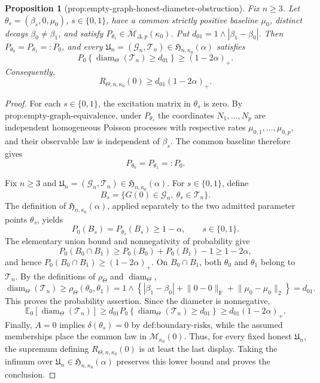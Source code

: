 \documentclass{article}
\newtheorem{proposition}{Proposition}
\begin{document}
\begin{proposition}[prop:empty-graph-honest-diameter-obstruction]\label{prop:empty-graph-honest-diameter-obstruction}
Fix \(n\geq3\). Let \(\theta_s=(\beta_s,0,\mu_0)\), \(s\in\{0,1\}\), have a common strictly positive baseline \(\mu_0\), distinct decays \(\beta_0\neq\beta_1\), and satisfy \(P_{\theta_s}\in\overline{\mathcal M}_{\Delta,p}(\kappa_0)\). Put \(d_{01}=1\wedge|\beta_1-\beta_0|\). Then \(P_{\theta_0}=P_{\theta_1}=:P_0\), and every \(\mathfrak U_n=(\mathcal G_n,\mathcal T_n)\in\mathfrak H_{n,\kappa_0}(\alpha)\) satisfies
\[
 P_0\!\left\{\operatorname{diam}_{\Theta}(\mathcal T_n)\geq d_{01}\right\}\geq(1-2\alpha)_+.
\]
Consequently,
\[
 R_{\Theta,n,\kappa_0}(0)\geq d_{01}(1-2\alpha)_+.
\]
\end{proposition}
\begin{proof}
For each \(s\in\{0,1\}\), the excitation matrix in \(\theta_s\) is zero. By \(\text{prop:empty-graph-equivalence}\), under \(P_{\theta_s}\) the coordinates \(N_1,\ldots,N_p\) are independent homogeneous Poisson processes with respective rates \(\mu_{0,1},\ldots,\mu_{0,p}\), and their observable law is independent of \(\beta_s\). The common baseline therefore gives
\[
 P_{\theta_0}=P_{\theta_1}=:P_0.
\]

Fix \(n\geq3\) and \(\mathfrak U_n=(\mathcal G_n,\mathcal T_n)\in\mathfrak H_{n,\kappa_0}(\alpha)\). For \(s\in\{0,1\}\), define
\[
 B_s=\{G(0)\in\mathcal G_n,\ \theta_s\in\mathcal T_n\}.
\]
The definition of \(\mathfrak H_{n,\kappa_0}(\alpha)\), applied separately to the two admitted parameter points \(\theta_s\), yields
\[
 P_0(B_s)=P_{\theta_s}(B_s)\geq1-\alpha,
 \qquad s\in\{0,1\}.
\]
The elementary union bound and nonnegativity of probability give
\[
 P_0(B_0\cap B_1)
 \geq P_0(B_0)+P_0(B_1)-1
 \geq1-2\alpha,
\]
and hence \(P_0(B_0\cap B_1)\geq(1-2\alpha)_+\). On \(B_0\cap B_1\), both \(\theta_0\) and \(\theta_1\) belong to \(\mathcal T_n\). By the definitions of \(\rho_{\Theta}\) and \(\operatorname{diam}_{\Theta}\),
\[
 \operatorname{diam}_{\Theta}(\mathcal T_n)
 \geq \rho_{\Theta}(\theta_0,\theta_1)
 =1\wedge\left\{|\beta_1-\beta_0|+\lVert0-0\rVert_{\mathrm F}+\lVert\mu_0-\mu_0\rVert_2\right\}
 =d_{01}.
\]
This proves the probability assertion. Since the diameter is nonnegative,
\[
 \mathbb E_0\!\left[\operatorname{diam}_{\Theta}(\mathcal T_n)\right]
 \geq d_{01}P_0\!\left\{\operatorname{diam}_{\Theta}(\mathcal T_n)\geq d_{01}\right\}
 \geq d_{01}(1-2\alpha)_+.
\]
Finally, \(A=0\) implies \(\delta(\theta_s)=0\) by \(\text{def:boundary-risks}\), while the assumed memberships place the common law in \(\mathcal M_{\kappa_0}(0)\). Thus, for every fixed honest \(\mathfrak U_n\), the supremum defining \(R_{\Theta,n,\kappa_0}(0)\) is at least the last display. Taking the infimum over \(\mathfrak U_n\in\mathfrak H_{n,\kappa_0}(\alpha)\) preserves this lower bound and proves the conclusion.
\end{proof}
\end{document}
